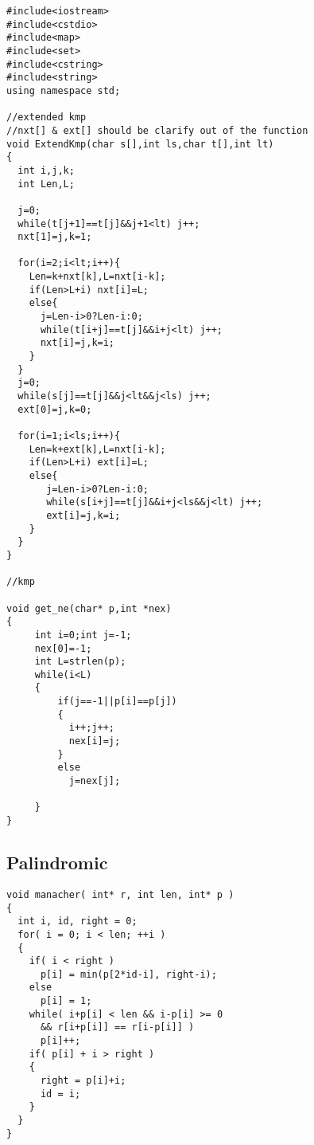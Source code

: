 \begin{lstlisting}[language={}]
#include<iostream>
#include<cstdio>
#include<map>
#include<set>
#include<cstring>
#include<string>
using namespace std;

//extended kmp
//nxt[] & ext[] should be clarify out of the function
void ExtendKmp(char s[],int ls,char t[],int lt)
{
  int i,j,k;
  int Len,L;

  j=0;
  while(t[j+1]==t[j]&&j+1<lt) j++;
  nxt[1]=j,k=1;

  for(i=2;i<lt;i++){
    Len=k+nxt[k],L=nxt[i-k];
    if(Len>L+i) nxt[i]=L;
    else{
      j=Len-i>0?Len-i:0;
      while(t[i+j]==t[j]&&i+j<lt) j++;
      nxt[i]=j,k=i;
    }
  }
  j=0;
  while(s[j]==t[j]&&j<lt&&j<ls) j++;
  ext[0]=j,k=0;

  for(i=1;i<ls;i++){
    Len=k+ext[k],L=nxt[i-k];
    if(Len>L+i) ext[i]=L;
    else{
       j=Len-i>0?Len-i:0;
       while(s[i+j]==t[j]&&i+j<ls&&j<lt) j++;
       ext[i]=j,k=i;
    }
  }
}

//kmp

void get_ne(char* p,int *nex)
{
     int i=0;int j=-1;
     nex[0]=-1;
     int L=strlen(p);
     while(i<L)
     {
         if(j==-1||p[i]==p[j])
         {
           i++;j++;
           nex[i]=j;
         }
         else
           j=nex[j];
         
     }
}
\end{lstlisting}
\subsection{Palindromic}
\begin{lstlisting}[language={}]
void manacher( int* r, int len, int* p )
{
  int i, id, right = 0;
  for( i = 0; i < len; ++i )
  {
    if( i < right )
      p[i] = min(p[2*id-i], right-i);
    else
      p[i] = 1;
    while( i+p[i] < len && i-p[i] >= 0 
      && r[i+p[i]] == r[i-p[i]] )
      p[i]++;
    if( p[i] + i > right )
    {
      right = p[i]+i;
      id = i;
    }
  }
}
\end{lstlisting}

